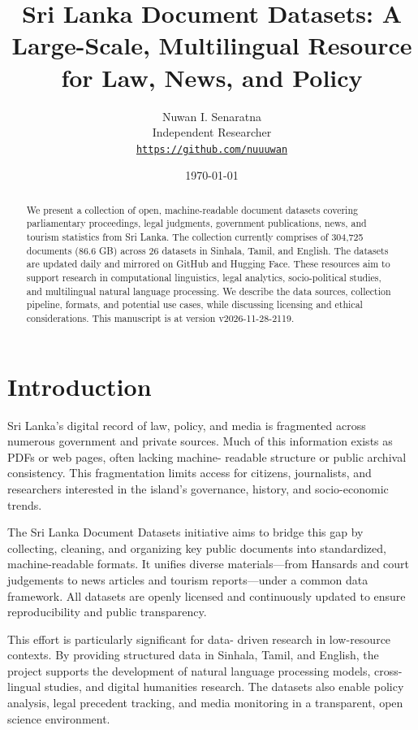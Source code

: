 \documentclass[10pt,a4paper]{article}%
\title{Sri Lanka Document Datasets: A Large{-}Scale, Multilingual Resource for Law, News, and Policy}%
\author{Nuwan I. Senaratna\\Independent Researcher\\\vspace{0.25em}\texttt{\href{https://github.com/nuuuwan}{https://github.com/nuuuwan}}}%
\date{\today}%
\begin{document}
%
\normalsize%
\maketitle%
\begin{abstract}%
We present a collection of open, machine-readable document datasets covering parliamentary proceedings, legal judgments, government publications, news, and tourism statistics from Sri Lanka. The collection currently comprises of  304,725  documents (86.6 GB) across 26  datasets in Sinhala, Tamil, and English. The datasets are updated daily and mirrored on GitHub and Hugging Face. These resources aim to support research in computational linguistics, legal analytics, socio-political studies, and multilingual natural language processing. We describe the data sources, collection pipeline, formats, and potential use cases, while discussing licensing and ethical considerations. This manuscript is at version v2026-11-28-2119.%

%
\end{abstract}%
\section{Introduction}%
\label{sec:Introduction}%
Sri Lanka’s digital record of law, policy, and media is fragmented across numerous government and private sources. Much of this information exists as PDFs or web pages, often lacking machine- readable structure or public archival consistency. This fragmentation limits access for citizens, journalists, and researchers interested in the island’s governance, history, and socio-economic trends.%

%
The Sri Lanka Document Datasets initiative aims to bridge this gap by collecting, cleaning, and organizing key public documents into standardized, machine-readable formats. It unifies diverse materials—from Hansards and court judgements to news articles and tourism reports—under a common data framework. All datasets are openly licensed and continuously updated to ensure reproducibility and public transparency.%

%
This effort is particularly significant for data- driven research in low-resource contexts. By providing structured data in Sinhala, Tamil, and English, the project supports the development of natural language processing models, cross-lingual studies, and digital humanities research. The datasets also enable policy analysis, legal precedent tracking, and media monitoring in a transparent, open science environment.%
\end{document}
